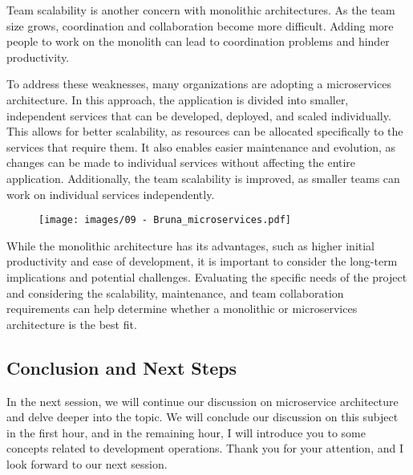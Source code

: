 Team scalability is another concern with monolithic architectures. As
the team size grows, coordination and collaboration become more
difficult. Adding more people to work on the monolith can lead to
coordination problems and hinder productivity.

To address these weaknesses, many organizations are adopting a
microservices architecture. In this approach, the application is divided
into smaller, independent services that can be developed, deployed, and
scaled individually. This allows for better scalability, as resources
can be allocated specifically to the services that require them. It also
enables easier maintenance and evolution, as changes can be made to
individual services without affecting the entire application.
Additionally, the team scalability is improved, as smaller teams can
work on individual services independently.

\begin{figure}[!h]
    \centering
    \texttt{[image: images/09 - Bruna\_microservices.pdf]}
\end{figure}

While the monolithic architecture has its advantages, such as higher
initial productivity and ease of development, it is important to
consider the long-term implications and potential challenges. Evaluating
the specific needs of the project and considering the scalability,
maintenance, and team collaboration requirements can help determine
whether a monolithic or microservices architecture is the best fit.

\subsection{Conclusion and Next Steps}

In the next session, we will continue our discussion on microservice
architecture and delve deeper into the topic. We will conclude our
discussion on this subject in the first hour, and in the remaining hour,
I will introduce you to some concepts related to development operations.
Thank you for your attention, and I look forward to our next session.
